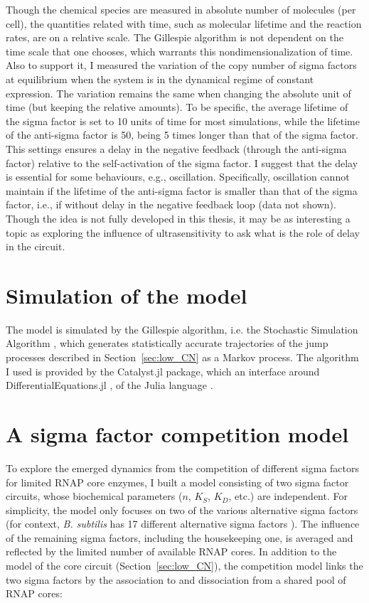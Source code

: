 Though the chemical species are measured in absolute number of molecules (per cell),
the quantities related with time, such as molecular lifetime and
the reaction rates, are on a relative scale.
The Gillespie algorithm is not dependent on the time scale that one chooses,
which warrants this nondimensionalization of time.
Also to support it, I measured the variation of the copy number of sigma factors
at equilibrium when the system is in the dynamical regime of 
constant expression.
The variation remains the same when changing the absolute unit of time
(but keeping the relative amounts).
To be specific, the average lifetime of the sigma factor is set to 10
units of time for most simulations, while the lifetime of the anti-sigma
factor is 50, being 5 times longer than that of the sigma factor.
This settings ensures a delay in the negative feedback (through the 
anti-sigma factor) relative to the self-activation of the sigma factor.
I suggest that the delay is essential for some behaviours, e.g.,
oscillation. Specifically, oscillation cannot maintain if the lifetime of 
the anti-sigma factor is smaller than that of the sigma factor, i.e.,
if without delay in the negative feedback loop (data not shown).
Though the idea is not fully developed in this thesis,
it may be as interesting a topic as exploring the influence of ultrasensitivity
to ask what is the role of delay in the circuit.


\section{Simulation of the model}

The model is simulated by the Gillespie algorithm, i.e. the
Stochastic Simulation Algorithm \cite{gillespie77},
which generates statistically accurate trajectories of the
jump processes described in Section~\ref{sec:low_CN} as
a Markov process.
The algorithm I used is provided by the Catalyst.jl \cite{catalystjl} package,
which an interface around DifferentialEquations.jl \cite{rackauckas17},
of the Julia language \cite{Julia-2017}.


\section{A sigma factor competition model}
\label{sec:sigma_competition_model}

To explore the emerged dynamics from the competition of different
sigma factors for limited RNAP core enzymes,
I built a model consisting of two sigma factor circuits,
whose biochemical parameters ($n$, $K_S$, $K_D$, etc.) are independent.
For simplicity, the model only focuses on two of the various 
alternative sigma factors (for context, \textit{B. subtilis} has 17 
different alternative sigma factors \cite{park18a}).
The influence of the remaining sigma factors, including the 
housekeeping one, is averaged and reflected by the limited
number of available RNAP cores.
In addition to the model of the core circuit (Section~\ref{sec:low_CN}),
the competition model links the two sigma factors by 
the association to and dissociation from a shared pool of
RNAP cores:

